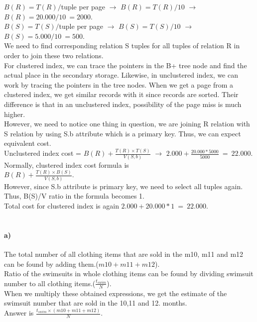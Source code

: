 \documentclass[a4paper,12pt]{article}
\begin{document}
\begin{tcolorbox}
$B(R) = T(R)/$tuple per page $\rightarrow$ $B(R) = T(R)/10$ $\rightarrow$ $B(R) = 20.000/10\ = 2000$. \\
$B(S) = T(S)/$tuple per page $\rightarrow$ $B(S) = T(S)/10$ $\rightarrow$ $B(S) = 5.000/10\ = 500$.\\
We need to find corresponding relation S tuples for all tuples of relation R in order to join these two relations.\\
For clustered index, we can trace the pointers in the B+ tree node and find the actual place in the secondary storage. Likewise, in unclustered index, we can work by tracing the pointers in the tree nodes. When we get a page from a clustered index, we get similar records with it since records are sorted. Their difference is that in an unclustered index, possibility of the page miss is much higher.\\
However, we need to notice one thing in question, we are joining R relation with S relation by using S.b attribute which is a primary key. Thus, we can expect equivalent cost.\\
Unclustered index cost = $B(R)+\frac{T(R)\times T(S)}{V(S,b)}$ $\rightarrow$ $2.000+\frac{20.000*5000}{5000}\ =\ 22.000$.\\  
Normally, clustered index cost formula is \\$B(R)+\frac{T(R)\times B(S)}{V(S,b)}$.\\ However, since S.b attribute is primary key, we need to select all tuples again. Thus, B(S)/V ratio in the formula becomes 1.\\ Total cost for clustered index is again $2.000+20.000*1\ =\ 22.000$.\\

\end{tcolorbox}

\newpage
\section{}

\paragraph{a)}

\begin{tcolorbox}
The total number of all clothing items that are sold in the m10, m11 and m12 can be found by adding them.($m10+m11+m12$).\\
Ratio of the swimsuits in whole clothing items can be found by dividing swimsuit number to all clothing items.($\frac{t_{swim}}{N}$).\\
When we multiply these obtained expressions, we get the estimate of the swimsuit number that are sold in the 10,11 and 12. months.\\
Answer is $\frac{t_{swim}\times (m10+m11+m12)}{N}$.
\end{tcolorbox}
\end{document}
